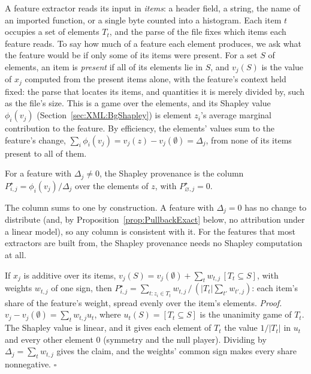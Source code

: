 A feature extractor reads its input in \emph{items}: a header field, a string, the name of an imported function, or a
single byte counted into a histogram. Each item $t$ occupies a set of elements $T_t$, and the parse of the file fixes
which items each feature reads. To say how much of a feature each element produces, we ask what the feature would be if
only some of its items were present. For a set $S$ of elements, an item is \emph{present} if all of its elements lie in
$S$, and $v_j(S)$ is the value of $x_j$ computed from the present items alone, with the feature's context held fixed:
the parse that locates its items, and quantities it is merely divided by, such as the file's size. This is a game over
the elements, and its Shapley value~\cite{shapley1953value} $\phi_i(v_j)$ (Section~\ref{sec:XML:BgShapley}) is element
$z_i$'s average marginal contribution to the feature. By efficiency, the elements' values sum to the feature's change,
$\sum_i \phi_i(v_j) = v_j(z) - v_j(\emptyset) = \Delta_j$, from none of its items present to all of them.

\label{def:ShapleyProvenance}
{
For a feature with $\Delta_j \neq 0$, the Shapley provenance is the column $P^\star_{i,j} = \phi_i(v_j) / \Delta_j$ over
the elements of $z$, with $P^\star_{\varnothing,j} = 0$.
}

The column sums to one by construction. A feature with $\Delta_j = 0$ has no change to distribute (and, by
Proposition~\ref{prop:PullbackExact} below, no attribution under a linear model), so any column is consistent with it.
For the features that most extractors are built from, the Shapley provenance needs no Shapley computation at all.

\label{prop:AdditiveShapley}
{
If $x_j$ is additive over its items, $v_j(S) = v_j(\emptyset) + \sum_t w_{t,j} \, [T_t \subseteq S]$, with weights
$w_{t,j}$ of one sign, then
$P^\star_{i,j} = \sum_{t : z_i \in T_t} w_{t,j} \, / \, (|T_t| \sum_{t'} w_{t',j})$: each item's share of the feature's
weight, spread evenly over the item's elements.
\textit{Proof.} $v_j - v_j(\emptyset) = \sum_t w_{t,j} u_t$, where $u_t(S) = [T_t \subseteq S]$ is the unanimity game
of $T_t$. The Shapley value is linear, and it gives each element of $T_t$ the value $1/|T_t|$ in $u_t$ and every
other element $0$ (symmetry and the null player). Dividing by $\Delta_j = \sum_t w_{t,j}$ gives the claim, and the
weights' common sign makes every share nonnegative. \hfill$\square$
}

